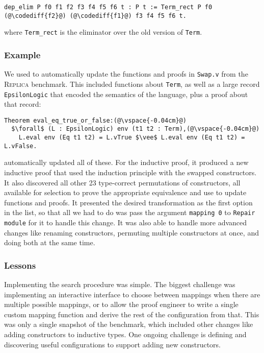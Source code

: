 \begin{lstlisting}[backgroundcolor=\color{cyan!30}]
dep_elim P f0 f1 f2 f3 f4 f5 f6 t : P t := Term_rect P f0 (@\codediff{f2}@) (@\codediff{f1}@) f3 f4 f5 f6 t.
\end{lstlisting}
where \lstinline{Term_rect} is the eliminator over the old version of \lstinline{Term}.

\subsubsection{Example}

We used \toolname to automatically update the functions and proofs in \lstinline{Swap.v} from the \textsc{Replica} benchmark.
This included functions about \lstinline{Term}, as well as a large record \lstinline{EpsilonLogic} that encoded the semantics of the language,
plus a proof about that record:

\begin{lstlisting}
Theorem eval_eq_true_or_false:(@\vspace{-0.04cm}@)
  $\forall$ (L : EpsilonLogic) env (t1 t2 : Term),(@\vspace{-0.04cm}@)
    L.eval env (Eq t1 t2) = L.vTrue $\vee$ L.eval env (Eq t1 t2) = L.vFalse.
\end{lstlisting}
\toolname automatically updated all of these. For the inductive proof, it produced
a new inductive proof that used the induction principle with the swapped constructors.
It also discovered all other 23 type-correct permutations of constructors, all available for selection to 
prove the appropriate equivalence and use to update functions and proofs.
It presented the desired transformation as the first option in the list, so that all we had to do
was pass the argument \lstinline{mapping 0} to \lstinline{Repair module} for it to handle this change.
It was also able to handle more advanced changes like renaming constructors, permuting multiple constructors at once,
and doing both at the same time.

\subsubsection{Lessons}

Implementing the search procedure was simple. %
The biggest challenge was implementing an interactive interface to choose between mappings when there are multiple possible mappings,
or to allow the proof engineer to write a single custom mapping function and derive the rest of the configuration from that.
This was only a single snapshot of the benchmark, which included
other changes like adding constructors to inductive types.
One ongoing challenge is defining and discovering useful configurations to support adding new constructors.


